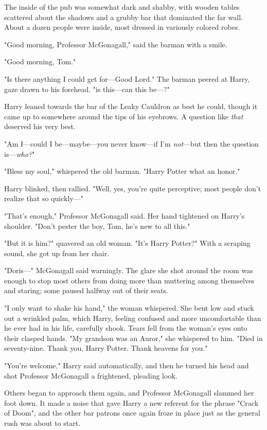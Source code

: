 The inside of the pub was somewhat dark and shabby, with
wooden tables scattered about the shadows and a grubby
bar that dominated the far wall. About a dozen people
were inside, most dressed in variously colored robes.

"Good morning, Professor McGonagall," said the barman
with a smile.

"Good morning, Tom."

"Is there anything I could get for—Good Lord." The barman
peered at Harry, gaze drawn to his forehead. "is this—can this be—?"

Harry leaned towards the bar of the Leaky Cauldron as best he could, though it
came up to somewhere around the tips of his eyebrows. A question like
\emph{that} deserved his very best.

"Am I—could I be—maybe—you never know—if I'm \emph{not}—but then the
question is—\emph{who?}"

"Bless my soul," whispered the old barman. "Harry Potter{\el} what an
honor."

Harry blinked, then rallied. "Well, yes, you're quite perceptive; most people
don't realize that so quickly—"

"That's enough," Professor McGonagall said. Her hand tightened on Harry's
shoulder. "Don't pester the boy, Tom, he's new to all this."

"But it is him?" quavered an old woman. "It's Harry Potter?" With a scraping
sound, she got up from her chair.

"Doris—" McGonagall said warningly. The glare she shot around the room
was enough to stop most others from doing
more than muttering among themselves and staring;
some paused halfway out of their seats.

"I only want to shake his hand," the woman whispered. She bent low and stuck
out a wrinkled palm, which Harry, feeling confused and more uncomfortable than
he ever had in his life, carefully shook. Tears fell from the woman's eyes onto
their clasped hands. "My grandson was an Auror," she whispered to him. "Died in
seventy-nine. Thank you, Harry Potter. Thank heavens for you."

"You're welcome," Harry said automatically, and then he turned his head and
shot Professor McGonagall a frightened, pleading look.

Others began to approach them again, and Professor
McGonagall slammed her foot down. It made a noise that
gave Harry a new referent for the phrase "Crack of
Doom", and the other bar patrons once again froze in
place just as the general rush was about to start.


